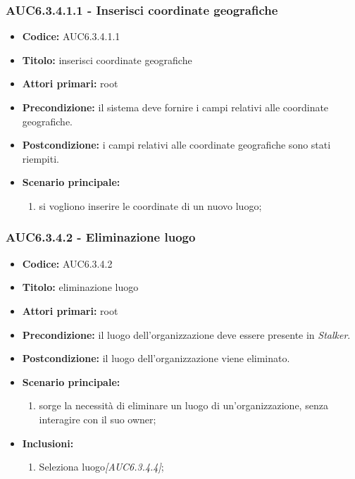 \documentclass[casi-duso]{subfiles}
\begin{document}
\subsubsection{AUC6.3.4.1.1 - Inserisci coordinate geografiche}%
\label{subsub:AUC6.3.4.1.1}
\begin{itemize}
  \item \textbf{Codice:} AUC6.3.4.1.1
  \item \textbf{Titolo:} inserisci coordinate geografiche
  \item \textbf{Attori primari:} root
  \item \textbf{Precondizione:} il sistema deve fornire i campi relativi alle coordinate geografiche.
  \item \textbf{Postcondizione:} i campi relativi alle coordinate geografiche sono stati riempiti.
  \item \textbf{Scenario principale:}
  \begin{enumerate}
    \item si vogliono inserire le coordinate di un nuovo luogo;
  \end{enumerate}
\end{itemize}

\subsubsection{AUC6.3.4.2 - Eliminazione luogo}%
\label{subsub:AUC6.3.4.2}
\begin{itemize}
  \item \textbf{Codice:} AUC6.3.4.2
  \item \textbf{Titolo:} eliminazione luogo
  \item \textbf{Attori primari:} root
  \item \textbf{Precondizione:} il luogo dell'organizzazione deve essere presente in \emph{Stalker}.
  \item \textbf{Postcondizione:} il luogo dell'organizzazione viene eliminato.
  \item \textbf{Scenario principale:}
  \begin{enumerate}
    \item sorge la necessità di eliminare un luogo di un'organizzazione, senza interagire con il suo owner;
  \end{enumerate}
  \item \textbf{Inclusioni:}
  \begin{enumerate}
    \item Seleziona luogo\emph{[AUC6.3.4.4]};
  \end{enumerate}
\end{itemize}
\end{document}
